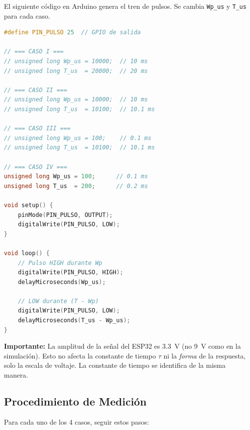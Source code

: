 \documentclass[12pt,a4paper]{article}
\begin{document}
El siguiente c\'odigo en Arduino genera el tren de pulsos. Se cambia \texttt{Wp\_us} y \texttt{T\_us} para cada caso.

\begin{lstlisting}[style=matlab, language=C++, caption={C\'odigo Arduino para el ESP32. Genera tren de pulsos en GPIO.}]
#define PIN_PULSO 25  // GPIO de salida

// === CASO I ===
// unsigned long Wp_us = 10000;  // 10 ms
// unsigned long T_us  = 20000;  // 20 ms

// === CASO II ===
// unsigned long Wp_us = 10000;  // 10 ms
// unsigned long T_us  = 10100;  // 10.1 ms

// === CASO III ===
// unsigned long Wp_us = 100;    // 0.1 ms
// unsigned long T_us  = 10100;  // 10.1 ms

// === CASO IV ===
unsigned long Wp_us = 100;      // 0.1 ms
unsigned long T_us  = 200;      // 0.2 ms

void setup() {
    pinMode(PIN_PULSO, OUTPUT);
    digitalWrite(PIN_PULSO, LOW);
}

void loop() {
    // Pulso HIGH durante Wp
    digitalWrite(PIN_PULSO, HIGH);
    delayMicroseconds(Wp_us);

    // LOW durante (T - Wp)
    digitalWrite(PIN_PULSO, LOW);
    delayMicroseconds(T_us - Wp_us);
}
\end{lstlisting}

\textbf{Importante:} La amplitud de la se\~nal del ESP32 es 3.3~V (no 9~V como en la simulaci\'on). Esto no afecta la constante de tiempo $\tau$ ni la \textit{forma} de la respuesta, solo la escala de voltaje. La constante de tiempo se identifica de la misma manera.

\subsection{Procedimiento de Medici\'on}

Para cada uno de los 4 casos, seguir estos pasos:
\end{document}
